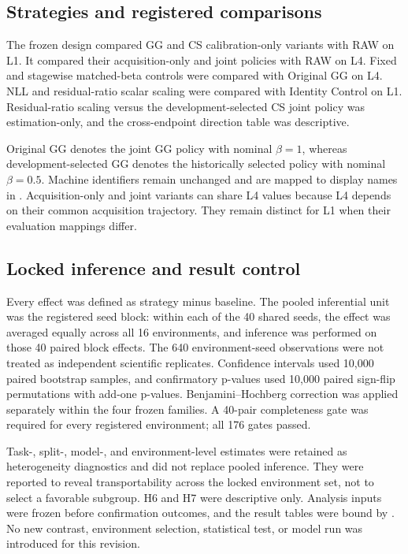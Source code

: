 \documentclass[10pt]{article}
\begin{document}
\subsection{Strategies and registered comparisons}
The frozen design compared GG and CS calibration-only variants with RAW on L1.
It compared their acquisition-only and joint policies with RAW on L4. Fixed
and stagewise matched-beta controls were compared with Original GG on L4. NLL
and residual-ratio scalar scaling were compared with Identity Control on L1.
Residual-ratio scaling versus the development-selected CS joint policy was
estimation-only, and the cross-endpoint direction table was descriptive.

Original GG denotes the joint GG policy with nominal $\beta=1$, whereas
development-selected GG denotes the historically selected policy with nominal
$\beta=0.5$. Machine identifiers remain unchanged and are mapped to display
names in . Acquisition-only and joint
variants can share L4 values because L4 depends on their common acquisition
trajectory. They remain distinct for L1 when their evaluation mappings differ.

\subsection{Locked inference and result control}
Every effect was defined as strategy minus baseline. The pooled inferential
unit was the registered seed block: within each of the 40 shared seeds, the
effect was averaged equally across all 16 environments, and inference was
performed on those 40 paired block effects. The 640 environment-seed
observations were not treated as independent scientific replicates.
Confidence intervals used 10,000 paired bootstrap samples, and confirmatory
p-values used 10,000 paired sign-flip permutations with add-one p-values.
Benjamini--Hochberg correction was applied separately within the four frozen
families. A 40-pair completeness gate was required for every registered
environment; all 176 gates passed.

Task-, split-, model-, and environment-level estimates were retained as
heterogeneity diagnostics and did not replace pooled inference. They were
reported to reveal transportability across the locked environment set, not to
select a favorable subgroup. H6 and H7 were descriptive only. Analysis inputs
were frozen before confirmation outcomes, and the result tables were bound by
. No new
contrast, environment selection, statistical test, or model run was
introduced for this revision.
\end{document}
